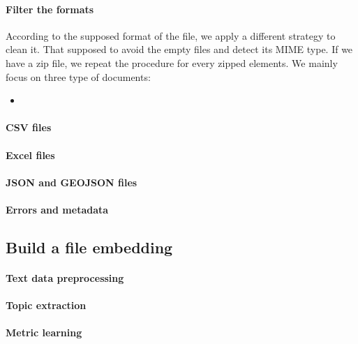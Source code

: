 \documentclass[a4paper]{article}
\begin{document}
	\paragraph{Filter the formats}
	
	According to the supposed format of the file, we apply a different strategy to clean it. That supposed to avoid the empty files and detect its MIME type. If we have a zip file, we repeat the procedure for every zipped elements. We mainly focus on three type of documents:
	\begin{itemize}
		\item
		
	\end{itemize}
	
	\paragraph{CSV files}
	
	\paragraph{Excel files}
	
	\paragraph{JSON and GEOJSON files}
	
	\paragraph{Errors and metadata}
	
	\subsection{Build a file embedding}
	
	\paragraph{Text data preprocessing}
	
	\paragraph{Topic extraction}
	
	\paragraph{Metric learning}
	
\end{document}
